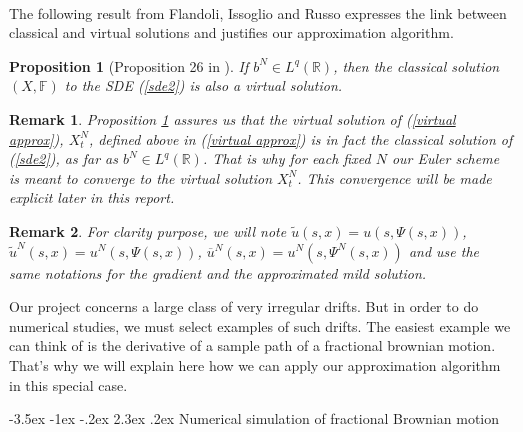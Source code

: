 \documentclass[11pt]{article}
\makeatletter
\renewcommand\section{\@startsection {section}{1}{\z@}%
    {-3.5ex \@plus -1ex \@minus -.2ex}%
    {2.3ex \@plus.2ex}%
    {\centering\large\scshape\bfseries}}
\newtheorem{Pro}{Proposition}
\newtheorem{rem}{Remark}
\newcommand{\R}{\mathbb{R}}
\makeatother
\begin{document}
\paragraph{}
The following result from Flandoli, Issoglio and Russo expresses the link between classical and virtual solutions and justifies our approximation algorithm.

\begin{Pro}[Proposition 26 in \cite{Fla-Iss-Rus-2017}]\label{rus}
    If $b^N\in L^q(\R)$, then the classical solution $(X,\mathbb{F})$ to the SDE (\ref{sde2}) is also a virtual solution.
\end{Pro}

\begin{rem}
    Proposition \ref{rus} assures us that the virtual solution of (\ref{virtual approx}), $X^N_t$, defined above in (\ref{virtual approx}) is in fact the classical solution of (\ref{sde2}), as far as $b^N\in L^q(\R)$. That is why for each fixed $N$ our Euler scheme is meant to converge to the virtual solution $X^N_t$. This convergence will be made explicit later in this report.
\end{rem}

\begin{rem}  
    For clarity purpose, we will note $\tilde{u}\left(s,x\right) = u\left(s,\Psi\left(s,x\right)\right)$, $\tilde{u}^N\left(s,x\right) = u^N\left(s,\Psi\left(s,x\right)\right)$, $\overline{u}^N\left(s,x\right) = u^N\left(s,\Psi^N\left(s,x\right)\right)$ and use the same notations for the gradient and the approximated mild solution. 
\end{rem}

Our project concerns a large class of very irregular drifts. But in order to do numerical studies, we must select examples of such drifts. The easiest example we can think of is the derivative of a sample path of a fractional brownian motion. That's why we will explain here how we can apply our approximation algorithm in this special case.

\section{Numerical simulation of fractional Brownian motion}    
\end{document}
